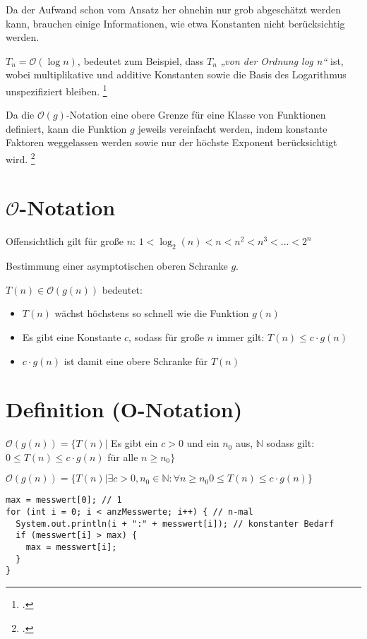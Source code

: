 \documentclass{lehramt-informatik-haupt}
\begin{document}
Da der Aufwand schon vom Ansatz her ohnehin nur grob abgeschätzt werden
kann, brauchen einige Informationen, wie etwa Konstanten nicht
berücksichtig werden.

 $T_n = \mathcal{O}(\log n)$, bedeutet zum Beispiel, dass $T_n$
\emph{„von der Ordnung log n“} ist, wobei multiplikative und additive
Konstanten sowie die Basis des Logarithmus unspezifiziert bleiben.
\footcite[Seite 200 (PDF 2018)]{saake}

Da die $\mathcal{O}(g)$-Notation eine obere Grenze für eine Klasse von
Funktionen definiert, kann die Funktion $g$ jeweils vereinfacht werden,
indem konstante Faktoren weggelassen werden sowie nur der höchste
Exponent berücksichtigt wird.
\footcite[Seite 201 (PDF 2019)]{saake}

\section{$\mathcal{O}$-Notation}

Offensichtlich gilt für große $n$:
$1 < \log_2(n) < n < n^2 < n^3 < ... < 2^n$

Bestimmung einer asymptotischen oberen Schranke $g$.

$T(n) \in \mathcal{O}(g(n))$ bedeutet:

\begin{itemize}
\item $T(n)$ wächst höchstens so schnell wie die Funktion $g(n)$

\item Es gibt eine Konstante $c$, sodass für große $n$ immer gilt: $T(n)
\leq c \cdot g(n)$

\item $c \cdot g(n)$ ist damit eine obere Schranke für $T(n)$
\end{itemize}

\section{Definition (O-Notation)}

$\mathcal{O}(g(n)) = \{T(n)|$
Es gibt ein
$c > 0$
und ein
$n_0$
aus,
$\mathbb{N}$
sodass gilt:
$0 \leq T(n) \leq c \cdot g(n)$
für alle
$n \geq n_0\}$

$\mathcal{O}(g(n)) = \{T(n)|
\exists
c > 0,
n_0 \in \mathbb{N}:
\forall n \geq n_0 0 \leq T(n) \leq c \cdot g(n)
\}$

\begin{verbatim}
max = messwert[0]; // 1
for (int i = 0; i < anzMesswerte; i++) { // n-mal
  System.out.println(i + ":" + messwert[i]); // konstanter Bedarf
  if (messwert[i] > max) {
    max = messwert[i];
  }
}
\end{verbatim}
\end{document}
